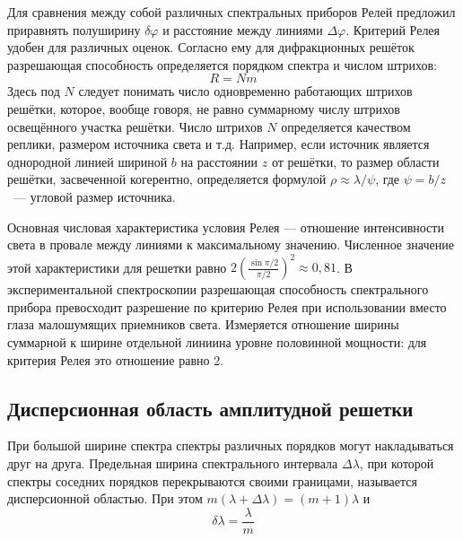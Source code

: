 Для сравнения между собой различных спектральных приборов Релей предложил приравнять полуширину $\delta\varphi$ и расстояние между линиями $\Delta\varphi$. Критерий Релея удобен для различных оценок. Согласно ему для дифракционных решёток разрешающая способность определяется порядком спектра и числом штрихов:\
\[
R = Nm
\]
Здесь под $N$ следует понимать число одновременно работающих штрихов решётки, которое, вообще говоря, не равно суммарному числу штрихов освещённого участка решётки. Число штрихов $N$ определяется качеством реплики, размером источника света и т.д. Например, если источник является однородной линией шириной $b$ на расстоянии $z$ от решётки, то размер области решётки, засвеченной когерентно, определяется формулой $\rho \approx \lambda / \psi$, где $\psi = b / z$~--- угловой размер источника.

Основная числовая характеристика условия Релея — отношение интенсивности света в провале между линиями к максимальному значению. Численное значение этой характеристики для решетки равно $2\left(\frac{\sin\pi / 2}{\pi / 2}\right)^2 \approx 0{,}81$. В экспериментальной спектроскопии разрешающая способность спектрального прибора превосходит разрешение по критерию Релея при использовании вместо глаза малошумящих приемников света. Измеряется отношение ширины суммарной к ширине отдельной линиина уровне половинной мощности: для критерия Релея это отношение равно 2.

\subsection{Дисперсионная область амплитудной решетки}
При большой ширине спектра спектры различных порядков могут накладываться друг на друга. Предельная ширина спектрального интервала $\Delta \lambda$, при которой спектры соседних порядков перекрываются своими границами, называется дисперсионной областью. При этом $m(\lambda + \Delta\lambda) = (m+1)\lambda$ и
\[
\delta\lambda = \frac{\lambda}{m}
\]
